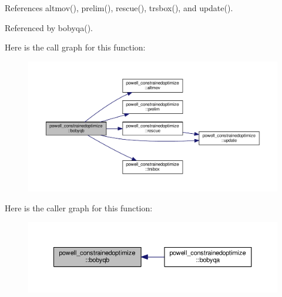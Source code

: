References altmov(), prelim(), rescue(), trsbox(), and update().



Referenced by bobyqa().

Here is the call graph for this function\+:
\nopagebreak
\begin{figure}[H]
\begin{center}
\leavevmode
\includegraphics[width=350pt]{namespacepowell__constrainedoptimize_a7c19fea82c74411b0aa5dc322b397049_cgraph}
\end{center}
\end{figure}
Here is the caller graph for this function\+:
\nopagebreak
\begin{figure}[H]
\begin{center}
\leavevmode
\includegraphics[width=350pt]{namespacepowell__constrainedoptimize_a7c19fea82c74411b0aa5dc322b397049_icgraph}
\end{center}
\end{figure}
\mbox{\label{namespacepowell__constrainedoptimize_ae7f7153e98c2ba47f65f71c04dfdc6b6}} 
